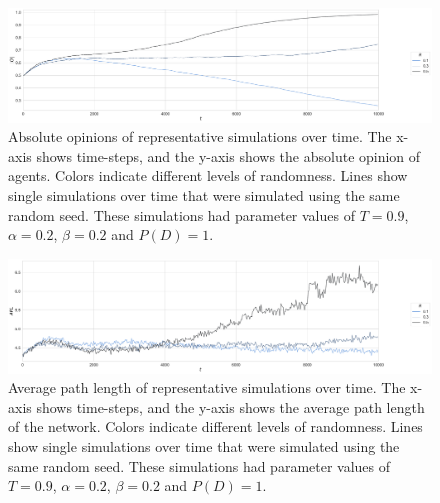 \documentclass[11pt]{article}
\begin{document}
\begin{figure}[H]
    \centering
    \includegraphics[width=.99\linewidth]{../plots/example/Example_Absolute_Opinion.pdf}
  \caption{Absolute opinions of representative simulations over time. The x-axis shows time-steps, and the y-axis shows the absolute opinion of agents. Colors indicate different levels of randomness. Lines show single simulations over time that were simulated using the same random seed. These simulations had parameter values of $T = 0.9$, $\alpha = 0.2$, $\beta = 0.2$ and $P(D) = 1$.}
  \label{fig:example_abs_opinion}
\end{figure}

\begin{figure}[H]
    \centering
    \includegraphics[width=.99\linewidth]{../plots/example/Example_Average_Path_Length.pdf}
  \caption{Average path length of representative simulations over time. The x-axis shows time-steps, and the y-axis shows the average path length of the network. Colors indicate different levels of randomness. Lines show single simulations over time that were simulated using the same random seed. These simulations had parameter values of $T = 0.9$, $\alpha = 0.2$, $\beta = 0.2$ and $P(D) = 1$.}
  \label{fig:example_path}
\end{figure}
\end{document}
